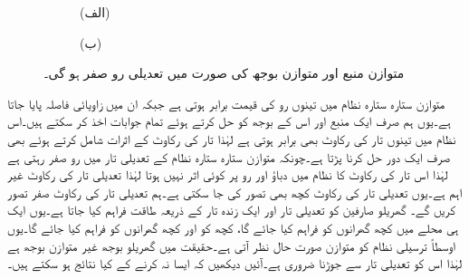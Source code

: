 \begin{figure}
\centering
\begin{subfigure}{0.5\textwidth}
\centering
{}
\caption*{(الف)}
\end{subfigure}%
\begin{subfigure}{0.5\textwidth}
\centering
{}
\caption*{(ب)}
\end{subfigure}
\caption{متوازن منبع اور متوازن بوجھ کی صورت میں تعدیلی رو صفر  ہو گی۔}
\label{شکل_تین_دوری_تعدیلی_رو_صفر}
\end{figure}

متوازن ستارہ ستارہ نظام میں تینوں رو کی قیمت برابر ہوتی ہے جبکہ ان میں زاویائی فاصلہ  پایا جاتا ہے۔یوں ہم صرف ایک منبع اور اس کے بوجھ کو حل کرتے ہوئے تمام جوابات اخذ کر سکتے ہیں۔اس نظام میں تینوں تار کی رکاوٹ بھی برابر ہوتی ہے لہٰذا تار کی رکاوٹ کے اثرات شامل کرتے ہوئے بھی صرف ایک دور حل کرنا پڑتا ہے۔چونکہ متوازن ستارہ ستارہ نظام کے تعدیلی تار میں رو صفر رہتی ہے لہٰذا اس تار کی رکاوٹ کا نظام میں دباؤ اور رو پر کوئی اثر نہیں ہوتا لہٰذا تعدیلی تار کی رکاوٹ غیر اہم ہے۔یوں تعدیلی تار کی رکاوٹ کچھ بھی تصور کی جا سکتی ہے۔ہم تعدیلی تار کی رکاوٹ صفر تصور کریں گے۔
گھریلو صارفین کو تعدیلی تار اور ایک زندہ تار کے ذریعہ طاقت فراہم کیا جاتا ہے۔یوں ایک ہی محلے میں کچھ گھرانوں کو  فراہم کیا جائے گا، کچھ کو
  اور کچھ گھرانوں کو  فراہم کیا جائے گا۔یوں اوسطاً ترسیلی نظام کو متوازن صورت حال نظر آتی ہے۔حقیقت میں گھریلو بوجھ غیر متوازن بوجھ ہے لہٰذا اس کو تعدیلی تار سے جوڑنا ضروری ہے۔آئیں دیکھیں کہ ایسا نہ کرنے کے کیا نتائج  ہو سکتے ہیں۔

